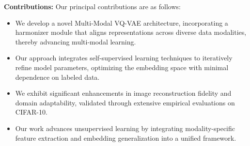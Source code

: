 \textbf{Contributions:} Our principal contributions are as follows:
\begin{itemize}
    \item We develop a novel Multi-Modal VQ-VAE architecture, incorporating a harmonizer module that aligns representations across diverse data modalities, thereby advancing multi-modal learning.
    \item Our approach integrates self-supervised learning techniques to iteratively refine model parameters, optimizing the embedding space with minimal dependence on labeled data.
    \item We exhibit significant enhancements in image reconstruction fidelity and domain adaptability, validated through extensive empirical evaluations on CIFAR-10.
    \item Our work advances unsupervised learning by integrating modality-specific feature extraction and embedding generalization into a unified framework.
\end{itemize}

